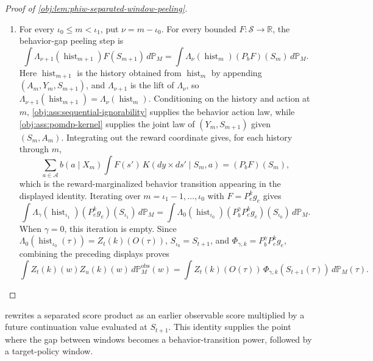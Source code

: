 \documentclass[11pt]{article}
\begin{document}
\begin{proof}[Proof of \cref{obj:lem:phiw-separated-window-peeling}]
\begin{enumerate}
\item For every \(\iota_0\le m<\iota_1\), put \(\nu=m-\iota_0\).  For every bounded \(F:\mathcal S\to\mathbb R\), the behavior-gap peeling step is
\[
\int
\Lambda_{\nu+1}(\operatorname{hist}_{m+1})F(S_{m+1})\,d\mathbb P_M
=
\int
\Lambda_{\nu}(\operatorname{hist}_{m})(P_bF)(S_m)\,d\mathbb P_M .
\]
Here \(\operatorname{hist}_{m+1}\) is the history obtained from \(\operatorname{hist}_m\) by appending
\((A_m,Y_m,S_{m+1})\), and \(\Lambda_{\nu+1}\) is the lift of \(\Lambda_\nu\), so
\(\Lambda_{\nu+1}(\operatorname{hist}_{m+1})=\Lambda_\nu(\operatorname{hist}_m)\). Conditioning on the history and action at \(m\), \cref{obj:ass:sequential-ignorability} supplies the behavior action law, while \cref{obj:ass:pomdp-kernel} supplies the joint law of \((Y_m,S_{m+1})\) given \((S_m,A_m)\).  Integrating out the reward coordinate gives, for each history through \(m\),
\[
\sum_{a\in\mathcal A} b(a\mid X_m)
\int F(s')\,K(dy\times ds'\mid S_m,a)
=
(P_bF)(S_m),
\]
which is the reward-marginalized behavior transition appearing in the displayed identity.  Iterating over \(m=\iota_1-1,\ldots,\iota_0\) with \(F=P_e^kg_e\) gives
\[
\int
\Lambda_{\gamma}(\operatorname{hist}_{\iota_1})(P_e^kg_e)(S_{\iota_1})\,d\mathbb P_M
=
\int
\Lambda_{0}(\operatorname{hist}_{\iota_0})
(P_b^\gamma P_e^kg_e)(S_{\iota_0})\,d\mathbb P_M .
\]
When \(\gamma=0\), this iteration is empty.  Since \(\Lambda_0(\operatorname{hist}_{\iota_0}(\tau))=Z_t(k)(O(\tau))\), \(S_{\iota_0}=S_{t+1}\), and \(\Phi_{\gamma,k}=P_b^\gamma P_e^kg_e\), combining the preceding displays proves
\[
\int Z_t(k)(w)Z_u(k)(w)\,d\mathbb P_M^{\mathrm{obs}}(w)
=
\int Z_t(k)(O(\tau))\,\Phi_{\gamma,k}(S_{t+1}(\tau))\,d\mathbb P_M(\tau).
\]
\end{enumerate}
\end{proof}

 rewrites a separated score product as an earlier observable score multiplied by a future continuation value evaluated at \(S_{t+1}\). This identity supplies the point where the gap between windows becomes a behavior-transition power, followed by a target-policy window.
\end{document}
